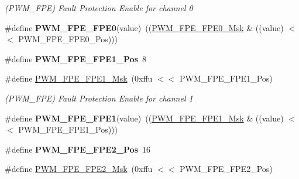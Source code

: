 \begin{DoxyCompactItemize}
\begin{DoxyCompactList}\small\item\em (P\+W\+M\+\_\+\+F\+PE) Fault Protection Enable for channel 0 \end{DoxyCompactList}\item 
\mbox{\label{group__SAME70__PWM_gada304e1da29948064fdb0d3398e71dd7}} 
\#define {\bfseries P\+W\+M\+\_\+\+F\+P\+E\+\_\+\+F\+P\+E0}(value)~((\mbox{\hyperlink{group__SAMV71__PWM_ga883b1a6b32d3255fe62e1e584659cb30}{P\+W\+M\+\_\+\+F\+P\+E\+\_\+\+F\+P\+E0\+\_\+\+Msk}} \& ((value) $<$$<$ P\+W\+M\+\_\+\+F\+P\+E\+\_\+\+F\+P\+E0\+\_\+\+Pos)))
\item 
\mbox{\label{group__SAME70__PWM_gaf8d476de94ddf131fcc23c23cbbf4402}} 
\#define {\bfseries P\+W\+M\+\_\+\+F\+P\+E\+\_\+\+F\+P\+E1\+\_\+\+Pos}~8
\item 
\mbox{\label{group__SAME70__PWM_ga41c1d32975b17740532d30eb42912879}} 
\#define \mbox{\hyperlink{group__SAME70__PWM_ga41c1d32975b17740532d30eb42912879}{P\+W\+M\+\_\+\+F\+P\+E\+\_\+\+F\+P\+E1\+\_\+\+Msk}}~(0xffu $<$$<$ P\+W\+M\+\_\+\+F\+P\+E\+\_\+\+F\+P\+E1\+\_\+\+Pos)
\begin{DoxyCompactList}\small\item\em (P\+W\+M\+\_\+\+F\+PE) Fault Protection Enable for channel 1 \end{DoxyCompactList}\item 
\mbox{\label{group__SAME70__PWM_ga155166e5eb3a0258dbd1afe05a73e4dc}} 
\#define {\bfseries P\+W\+M\+\_\+\+F\+P\+E\+\_\+\+F\+P\+E1}(value)~((\mbox{\hyperlink{group__SAMV71__PWM_ga41c1d32975b17740532d30eb42912879}{P\+W\+M\+\_\+\+F\+P\+E\+\_\+\+F\+P\+E1\+\_\+\+Msk}} \& ((value) $<$$<$ P\+W\+M\+\_\+\+F\+P\+E\+\_\+\+F\+P\+E1\+\_\+\+Pos)))
\item 
\mbox{\label{group__SAME70__PWM_ga21f498501f20a5815cbe734e7423e6f9}} 
\#define {\bfseries P\+W\+M\+\_\+\+F\+P\+E\+\_\+\+F\+P\+E2\+\_\+\+Pos}~16
\item 
\mbox{\label{group__SAME70__PWM_ga3dbe9d68d6f74bdebf54e40585180117}} 
\#define \mbox{\hyperlink{group__SAME70__PWM_ga3dbe9d68d6f74bdebf54e40585180117}{P\+W\+M\+\_\+\+F\+P\+E\+\_\+\+F\+P\+E2\+\_\+\+Msk}}~(0xffu $<$$<$ P\+W\+M\+\_\+\+F\+P\+E\+\_\+\+F\+P\+E2\+\_\+\+Pos)

\end{DoxyCompactItemize}
